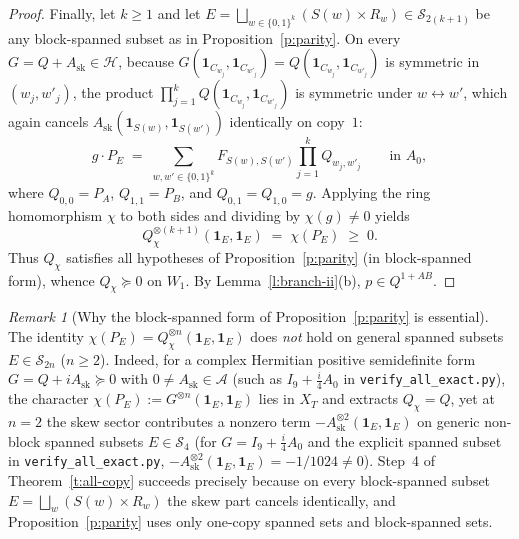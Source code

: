 \documentclass[11pt,a4paper]{article}
\theoremstyle{definition}
\theoremstyle{remark}
\newtheorem{remark}[theorem]{Remark}
\newcommand{\ind}[1]{\mathbf{1}_{#1}}
\newcommand{\QAB}{Q^{1+AB}}
\begin{document}
\begin{proof}
Finally, let $k \ge 1$ and let $E = \bigsqcup_{w \in \{0,1\}^k} (S(w) \times R_w) \in \mathcal{S}_{2(k+1)}$ be any block-spanned subset as in Proposition~\ref{p:parity}. On every $G = Q + A_{\mathrm{sk}} \in \mathcal{H}$, because $G(\ind{C_{w_j}}, \ind{C_{w'_j}}) = Q(\ind{C_{w_j}}, \ind{C_{w'_j}})$ is symmetric in $(w_j, w'_j)$, the product $\prod_{j=1}^k Q(\ind{C_{w_j}}, \ind{C_{w'_j}})$ is symmetric under $w \leftrightarrow w'$, which again cancels $A_{\mathrm{sk}}(\ind{S(w)}, \ind{S(w')})$ identically on copy~$1$:
\[
  g \cdot P_E \;=\; \sum_{w, w' \in \{0,1\}^k} F_{S(w), S(w')} \prod_{j=1}^k Q_{w_j, w'_j} \qquad \text{in } A_0,
\]
where $Q_{0,0} = P_A$, $Q_{1,1} = P_B$, and $Q_{0,1} = Q_{1,0} = g$. Applying the ring homomorphism $\chi$ to both sides and dividing by $\chi(g) \neq 0$ yields
\[
  Q_\chi^{\otimes(k+1)}(\ind E, \ind E) \;=\; \chi(P_E) \;\ge\; 0.
\]
Thus $Q_\chi$ satisfies all hypotheses of Proposition~\ref{p:parity} (in block-spanned form), whence $Q_\chi \succeq 0$ on $W_1$. By Lemma~\ref{l:branch-ii}(b), $p \in \QAB$.
\end{proof}

\begin{remark}[Why the block-spanned form of Proposition~\ref{p:parity} is essential]\label{r:skew}
The identity $\chi(P_E) = Q_\chi^{\otimes n}(\ind E, \ind E)$ does \emph{not} hold on general spanned subsets $E \in \mathcal{S}_{2n}$ ($n \ge 2$). Indeed, for a complex Hermitian positive semidefinite form $G = Q + i A_{\mathrm{sk}} \succeq 0$ with $0 \neq A_{\mathrm{sk}} \in \mathcal{A}$ (such as $I_9 + \frac{i}{4} A_0$ in \texttt{verify\_all\_exact.py}), the character $\chi(P_E) := G^{\otimes n}(\ind E, \ind E)$ lies in $X_T$ and extracts $Q_\chi = Q$, yet at $n = 2$ the skew sector contributes a nonzero term $-A_{\mathrm{sk}}^{\otimes 2}(\ind E, \ind E)$ on generic non-block spanned subsets $E \in \mathcal{S}_4$ (for $G = I_9 + \frac{i}{4} A_0$ and the explicit spanned subset in \texttt{verify\_all\_exact.py}, $-A_{\mathrm{sk}}^{\otimes 2}(\ind E, \ind E) = -1/1024 \neq 0$). Step~4 of Theorem~\ref{t:all-copy} succeeds precisely because on every block-spanned subset $E = \bigsqcup_w (S(w) \times R_w)$ the skew part cancels identically, and Proposition~\ref{p:parity} uses only one-copy spanned sets and block-spanned sets.
\end{remark}
\end{document}
